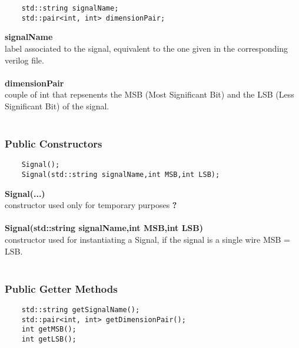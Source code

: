 \documentclass{article}
\begin{document}
\begin{mdframed}[hidealllines=true, backgroundcolor=magenta!10]
	\begin{lstlisting}
	std::string signalName;
	std::pair<int, int> dimensionPair;
	\end{lstlisting}
\end{mdframed}

\textbf{signalName}\\
	label associated to the signal, equivalent to the one given in the corresponding verilog file.\\\\
\textbf{dimensionPair }\\
	couple of int that repsenents the MSB (Most Significant Bit) and the LSB (Less Significant Bit) of the signal.\\\\
	
\subsubsection{Public Constructors}

\begin{mdframed}[hidealllines=true, backgroundcolor=magenta!10]
	\begin{lstlisting}
	Signal();
	Signal(std::string signalName,int MSB,int LSB);
	\end{lstlisting}
\end{mdframed}

\textbf{Signal(...)}\\
constructor used only for temporary purposes \textbf{?}\\\\
\textbf{Signal(std::string signalName,int MSB,int LSB)}\\
constructor used for instantiating a Signal, if the signal is a single wire MSB = LSB.\\\\

\subsubsection{Public Getter Methods}

\begin{mdframed}[hidealllines=true, backgroundcolor=magenta!10]
	\begin{lstlisting}
	std::string getSignalName();
	std::pair<int, int> getDimensionPair();
	int getMSB();
	int getLSB();
	\end{lstlisting}
\end{mdframed}
\end{document}
